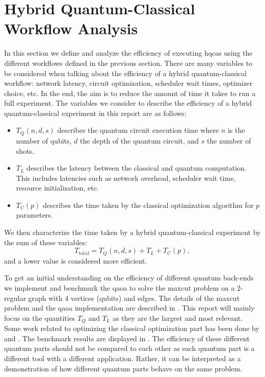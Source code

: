 \section{Hybrid Quantum-Classical Workflow Analysis} \label{sec:hqca-analysis}
In this section we define and analyze the efficiency of executing \glspl{hqca} using the different workflows defined in the previous section.
There are many variables to be considered when talking about the efficiency of a hybrid quantum-classical workflow: network latency, circuit optimization, scheduler wait times, optimizer choice, etc.
In the end, the aim is to reduce the amount of time it takes to run a full experiment.
The variables we consider to describe the efficiency of a hybrid quantum-classical experiment in this report are as follows:
\begin{itemize}
    \item $T_Q(n, d, s)$ describes the quantum circuit execution time where $n$ is the number of qubits, $d$ the depth of the quantum circuit, and $s$ the number of shots.
    \item $T_L$ describes the latency between the classical and quantum computation. This includes latencies such as network overhead, scheduler wait time, resource initialization, etc.
    \item $T_C(p)$ describes the time taken by the classical optimization algorithm for $p$ parameters.
\end{itemize}
We then characterize the time taken by a hybrid quantum-classical experiment by the sum of these variables:
\begin{equation}
T_\text{total} = T_Q(n, d, s) + T_L + T_C(p),
\end{equation}
and a lower value is considered more efficient.

To get an initial understanding on the efficiency of different quantum back-ends we implement and benchmark the \gls{qaoa} to solve the \gls{maxcut} problem on a 2-regular graph with 4 vertices (qubits) and edges.
The details of the \gls{maxcut} problem and the \gls{qaoa} implementation are described in .
This report will mainly focus on the quantities $T_Q$ and $T_L$ as they are the largest and most relevant.
Some work related to optimizing the classical optimization part has been done by \textcite{lavrijsen2020classical} and \textcite{sung2020exploration}.
The benchmark results are displayed in .
The efficiency of these different quantum parts should not be compared to each other as each quantum part is a different tool with a different application.
Rather, it can be interpreted as a demonstration of how different quantum parts behave on the same problem.

